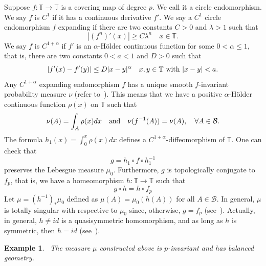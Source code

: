 \documentclass[11pt]{amsart}
\newtheorem{example}{Example}
\theoremstyle{definition}
\def\m{\mu}
\def\T{\mathbb{T}}
\def\B{\mathcal{B}}
\begin{document}
 
Suppose $f: \T\to \T$ is a covering map of degree $p$. We call it a circle endomorphism. We say $f$ is $C^{1}$ if it has a continuous derivative $f'$. We say a $C^{1}$ circle endomorphism $f$ expanding if there are two constants $C>0$ and $\lambda >1$ such that
$$
|(f^{n})' (x)| \geq C \lambda^{n} \quad x\in \T.
$$
We say $f$ is $C^{1+\alpha}$ if $f'$ is an $\alpha$-H\"older continuous function for some $0<\alpha\leq 1$, that is, there are two constants $0<a <1$ and $D>0$ such that 
$$
|f'(x) -f'(y)| \leq D|x-y|^{\alpha} \quad x, y \in \T \hbox{ with } |x-y|<a.
$$
Any $C^{1+\alpha}$ expanding endomorphism $f$ has a unique smooth $f$-invariant probability measure $\nu$ (refer to~\cite{JRue,JRig}). This means that we have a positive $\alpha$-H\"older continuous function $\rho (x)$ on $\T$ such that
$$
\nu (A) =\int_{A} \rho (x) dx\quad \hbox{and}\quad \nu (f^{-1} (A)) =\nu (A), \quad \forall A\in \B.
$$
The formula $h_{1}(x)=\int_{0}^{x} \rho(x) dx$ defines a $C^{1+\alpha}$-diffeomorphism of $\T$. One can check that 
$$
g= h_{1} \circ f\circ h_{1}^{-1}
$$
preserves the Lebesgue measure $\m_{0}$.
Furthermore, $g$ is topologically conjugate to $f_{p}$, that is, we have a homeomorphism $h: \T\to \T$ such that
$$
g\circ h= h\circ f_{p}
$$
Let $\m=(h^{-1})_{*} \m_{0}$ defined as $\m(A) =\m_{0} (h(A))$ for all $A\in \B$. In general, $\m$ is totally singular with respective to $\m_{0}$ since, otherwise, $g=f_{p}$ (see~\cite{JRig}). 
Actually, in general, $h\not=id$ is a quasisymmetric homomorphism, and as long as $h$ is symmetric, then $h=id$ (see~\cite{JRig}).  

 \medskip
\begin{example}~\label{pex}
The measure $\m$ constructed above is $p$-invariant and has balanced geometry.
\end{example}
\end{document}
